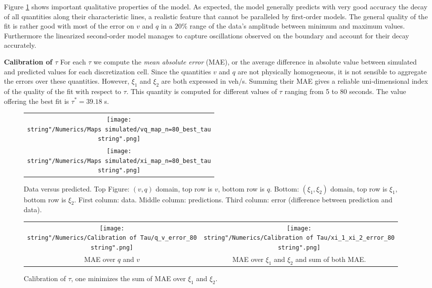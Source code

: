 \documentclass[preprint]{elsarticle}
\begin{document}
Figure \ref{fig:Data-versus-predicted.} shows important qualitative properties of the model. As expected, the model generally predicts with very good accuracy the decay of all quantities along their characteristic lines, a realistic feature that cannot be paralleled by first-order models. The general quality of the fit is rather good with most of the error on $v$ and $q$ in a $20\%$ range of the data's amplitude between minimum and maximum values. Furthermore the linearized second-order model manages to capture oscillations observed on the boundary and account for their decay accurately. 

\textbf{Calibration of $\tau$\label{sub:Calibration-of-tau}} For each $\tau$ we compute the \textit{mean absolute error} (MAE), or the average difference in absolute value between simulated and predicted values for each discretization cell. Since the quantities $v$ and $q$ are not physically homogeneous, it is not sensible to aggregate the errors over these quantities. However, $\xi_{1}$
and $\xi_{2}$ are both expressed in veh/s. Summing their MAE gives a reliable uni-dimensional index of the quality of the fit with respect
to $\tau$. This quantity is computed for different values of $\tau$
ranging from 5 to 80 seconds. The value offering the best fit
is $\tau^{*}=39.18$ s.

\begin{figure}[H]
\centering
\begin{tabular}{c}
\texttt{[image: \\string"/Numerics/Maps simulated/vq\_map\_n=80\_best\_tau\\string".png]}\tabularnewline
\texttt{[image: \\string"/Numerics/Maps simulated/xi\_map\_n=80\_best\_tau\\string".png]}
\end{tabular}
\protect\caption{Data versus predicted. Top Figure: $\left(v,q\right)$ domain, top row is $v$, bottom row is $q$. Bottom: $\left(\xi_{1},\xi_{2}\right)$
domain, top row is $\xi_{1}$, bottom row is $\xi_{2}$. First column: data. Middle column: predictions. Third column: error (difference between prediction and data).\label{fig:Data-versus-predicted.}}
\end{figure}

\begin{figure}[H]
\centering
\begin{tabular}{cc}
\texttt{[image: \\string"/Numerics/Calibration of Tau/q\_v\_error\_80\\string".png]} & \texttt{[image: \\string"/Numerics/Calibration of Tau/xi\_1\_xi\_2\_error\_80\\string".png]}\tabularnewline
MAE over $q$ and $v$ & MAE over $\xi_{1}$ and $\xi_{2}$ and sum of both MAE.\tabularnewline
\end{tabular}
\protect\caption{Calibration of $\tau$, one minimizes the sum of MAE over $\xi_{1}$
and $\xi_{2}$.}
\end{figure}
\end{document}
